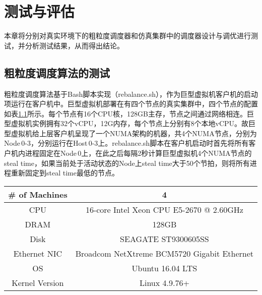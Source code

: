 
\chapter{测试与评估}
本章将分别对真实环境下的粗粒度调度器和仿真集群中的调度器设计与调优进行测试，并分析测试结果，从而得出结论。

\section{粗粒度调度算法的测试}
粗粒度调度算法基于Bash脚本实现（rebalance.sh），作为巨型虚拟机客户机的启动项运行在客户机中。巨型虚拟机部署在有四个节点的真实集群中，四个节点的配置如表\ref{tab:config}所示。每个节点有16个CPU核，128GB主存，节点之间通过网络相连。巨型虚拟机实例拥有32个vCPU，12G内存，每个节点上分别有8个本地vCPU。故巨型虚拟机给上层客户机呈现了一个NUMA架构的机器，共4个NUMA节点，分别为Node\,0-3，分别运行在Host\,0-3上。rebalance.sh脚本在客户机启动时首先将所有客户机内进程固定在Node\,0上，在此之后每隔2秒计算巨型虚拟机4个NUMA节点的steal time，如果当前处于活动状态的Node上steal time大于50个节拍，则将所有进程重新固定到steal time最低的节点。

\begin{table}[!htpb]
  \label{tab:config}
  \centering
  \begin{threeparttable}[b]
     \begin{tabular}{c|c}
      \toprule
      \# of Machines & 4  \\
      \hline
      CPU & 16-core Intel Xeon CPU E5-2670 @ 2.60GHz  \\
      \hline
      DRAM & 128GB \\
      \hline
      Disk & SEAGATE ST9300605SS \\
      \hline
      Ethernet NIC & Broadcom NetXtreme BCM5720 Gigabit Ethernet \\
      \hline
      OS & Ubuntu 16.04 LTS \\
      \hline
      Kernel Version & Linux 4.9.76+ \\
      \bottomrule
    \end{tabular}
  \end{threeparttable}
\end{table}

